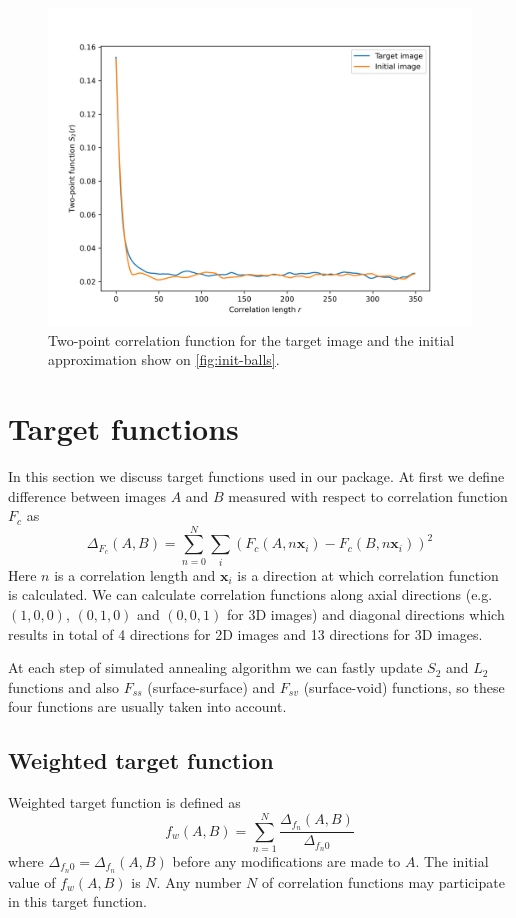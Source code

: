 \documentclass[preprint,amsmath,amssymb,aps,pre,nofootinbib]{revtex4-1}
\begin{document}
\begin{figure}[ht]
  \centering
  \includegraphics[width=\linewidth]{../corrfns-plots/init-s2.png}
  \caption[]{Two-point correlation function for the target image and the initial
  approximation show on \cref{fig:init-balls}.}
  \label{fig:init-balls-s2}
\end{figure}

\section{Target functions}
\label{sec:target}
In this section we discuss target functions used in our package. At first we
define difference between images $A$ and $B$ measured with respect to
correlation function $F_c$ as
\begin{equation*}
  \Delta_{F_{c}}(A, B) = \sum_{n=0}^{N} \sum_{i} (F_c(A, n\mathbf{x}_i) - F_c(B, n\mathbf{x}_i))^2
\end{equation*}
Here $n$ is a correlation length and $\mathbf{x}_i$ is a direction at which
correlation function is calculated. We can calculate correlation functions along
axial directions (e.g. $(1,0,0)$, $(0, 1, 0)$ and $(0, 0, 1)$ for 3D images) and
diagonal directions which results in total of 4 directions for 2D images and 13
directions for 3D images.

At each step of simulated annealing algorithm we can fastly update $S_2$ and
$L_2$ functions and also $F_{ss}$ (surface-surface) and $F_{sv}$ (surface-void)
functions, so these four functions are usually taken into account.

\subsection{Weighted target function}
\label{sec:target-weighted}
Weighted target function \cite{gerke-target} is defined as
\begin{equation*}
  f_w(A, B) = \sum_{n=1}^{N} \frac{\Delta_{f_n}(A, B)}{\Delta_{{f_n}0}}
\end{equation*}
where $\Delta_{{f_n}0} = \Delta_{f_n}(A, B)$ before any modifications are made
to $A$. The initial value of $f_w(A, B)$ is $N$. Any number $N$ of correlation
functions may participate in this target function.
\end{document}
